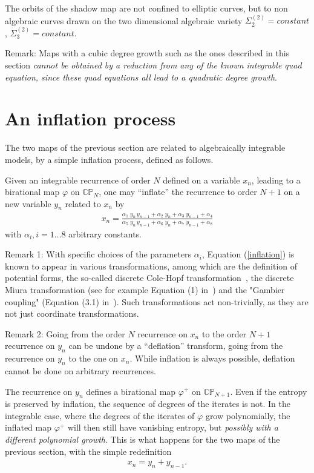 \documentclass[reqno]{amsart}
\numberwithin{equation}{section}
\numberwithin{figure}{section}
\begin{document}
The orbits of the shadow map are not confined to elliptic curves, but
to non algebraic curves drawn on the two dimensional  algebraic variety
$\Sigma_2^{(2)} = constant$, $ \Sigma_3^{(2)} = constant$.

Remark: Maps with a cubic degree growth such as the ones described in
this section {\em cannot be obtained by a reduction from any of the
  known integrable quad equation, since these quad equations all lead
  to a quadratic degree growth}.



\section{An inflation process}
\label{an_inflation}
The two maps of the previous section are related to algebraically
integrable models, by a simple inflation process, defined as follows.

Given an integrable recurrence of order $N$ defined on a variable
$x_n$, leading to a birational map $\varphi$ on $\mathbb C \mathbb
P_N$, one may ``inflate'' the recurrence to order $N+1$ on a new
variable $y_n$ related to $x_n$ by
\begin{eqnarray}
  \label{inflation}
  x_n =\frac{ \alpha_1\; y_n\, y_{n-1} + \alpha_2\; y_n + \alpha_3
    \;y_{n-1} + \alpha_4}{\alpha_5 \; y_n \, y_{n-1} + \alpha_6\; y_n
    + \alpha_7\; y_{n-1} + \alpha_8}
\end{eqnarray}
with  $\alpha_i,{ i=1 \dots 8}$ arbitrary constants.

Remark 1: With specific choices of the parameters $\alpha_i$, Equation
(\ref{inflation}) is known to appear in various transformations, among
which are the definition of potential forms, the so-called discrete
Cole-Hopf transformation~\cite{LeRaBr82}, the discrete Miura
transformation (see for example Equation (1) in~\cite{JoRaGr98}) {   and
the "Gambier coupling" (Equation (3.1) in~\cite{LaGrRa98})}.  Such
transformations act non-trivially, as they are not just coordinate
transformations.

Remark 2: Going from the order $N$ recurrence on $x_n$ to the order
$N+1$ recurrence on $y_n$ can be undone by a ``deflation'' transform,
going from the recurrence on $y_n$ to the one on $x_n$. While
inflation is always possible, deflation cannot be done on arbitrary
recurrences.


The recurrence on $y_n$ defines a birational map $ \varphi^+$ on
$\mathbb C \mathbb P_{N+1}$. Even if the entropy is preserved by
inflation, the sequence of degrees of the iterates is not.  In the
integrable case, where the degrees of the iterates of $\varphi$ grow
polynomially, the inflated map $\varphi^+$ will then still have
vanishing entropy, but {\em possibly with a different polynomial
  growth}. This is what happens for the two maps of the previous
section, with the simple redefinition
\begin{eqnarray}
  \label{somme}
  x_n = y_n + y_{n-1}.
\end{eqnarray}
\end{document}
